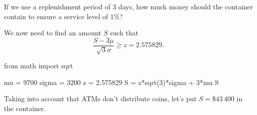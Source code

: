 \begin{exercise}[Continuation]
  If we use a replenishment period of 3 days, how much money should the container contain to ensure a service level of $1\%$?
  \begin{solution}
We now need to find an amount $S$ such that
\begin{equation*}
\frac{S-3\mu}{\sqrt{3} \sigma} \geq z = 2.575829.
\end{equation*}
\begin{pyconsole}
from math import sqrt

mu = 9700
sigma = 3200
z = 2.575829
S = z*sqrt(3)*sigma + 3*mu
S
\end{pyconsole}

Taking into account that ATMs don't distribute coins, let's put $S=\$43\,400$ in the container.
  \end{solution}
\end{exercise}

\begin{comment}

We shall cover here the following policies

Possible exercises:
\begin{itemize}
\item an exercise on why $(T,Q)$ is silly
\end{itemize}
  
\end{comment}




\clearpage


